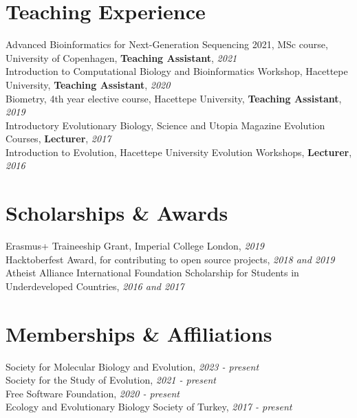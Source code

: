 \documentclass[letterpaper,10.5pt]{article}
\begin{document}
\section{Teaching Experience}
Advanced Bioinformatics for Next-Generation Sequencing 2021, MSc course, University of Copenhagen, \textbf{Teaching Assistant}, \textit{2021} \\
Introduction to Computational Biology and Bioinformatics Workshop, Hacettepe University, \textbf{Teaching Assistant}, \textit{2020} \\
Biometry, 4th year elective course, Hacettepe University, \textbf{Teaching Assistant}, \textit{2019} \\
Introductory Evolutionary Biology, Science and Utopia Magazine Evolution Courses, \textbf{Lecturer}, \textit{2017} \\
Introduction to Evolution, Hacettepe University Evolution Workshops, \textbf{Lecturer}, \textit{2016} \\


\section{Scholarships \& Awards}
Erasmus+ Traineeship Grant, Imperial College London, \textit{2019} \\
Hacktoberfest Award, for contributing to open source projects, \textit{2018 and 2019} \\
Atheist Alliance International Foundation Scholarship for Students in Underdeveloped Countries, \textit{2016 and 2017} \\

\section{Memberships \& Affiliations}
Society for Molecular Biology and Evolution, \textit{2023 - present} \\
Society for the Study of Evolution, \textit{2021 - present} \\
Free Software Foundation, \textit{2020 - present} \\
Ecology and Evolutionary Biology Society of Turkey, \textit{2017 - present} \\
\end{document}
